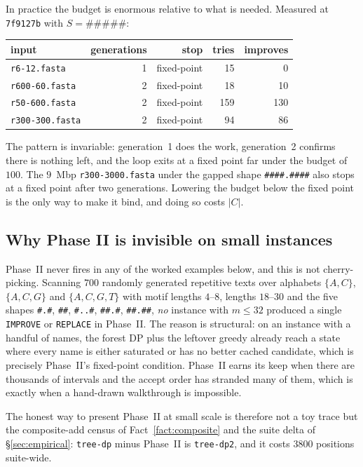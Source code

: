 \documentclass[11pt,a4paper]{article}
\theoremstyle{definition}
\theoremstyle{plain}
\theoremstyle{remark}
\begin{document}
In practice the budget is enormous relative to what is needed.
Measured at \texttt{7f9127b} with $S = \mathtt{\#\#\#\#\#}$:

\begin{center}
\begin{tabular}{lrrrr}
\toprule
input & generations & stop & tries & improves \\
\midrule
\texttt{r6-12.fasta}   & 1 & fixed-point &  15 &   0 \\
\texttt{r600-60.fasta} & 2 & fixed-point &  18 &  10 \\
\texttt{r50-600.fasta} & 2 & fixed-point & 159 & 130 \\
\texttt{r300-300.fasta}& 2 & fixed-point &  94 &  86 \\
\bottomrule
\end{tabular}
\end{center}

The pattern is invariable: generation~1 does the work, generation~2
confirms there is nothing left, and the loop exits at a fixed point far
under the budget of $100$. The $9$~Mbp \texttt{r300-3000.fasta} under
the gapped shape \texttt{\#\#\#\#.\#\#\#\#} also stops at a fixed point
after two generations. Lowering the budget below the fixed point is the
only way to make it bind, and doing so costs $|C|$.

\subsection{Why Phase II is invisible on small instances}
\label{sec:phase2:small}

Phase~II never fires in any of the worked examples below, and this is
not cherry-picking. Scanning $700$ randomly generated repetitive texts
over alphabets $\{A,C\}$, $\{A,C,G\}$ and $\{A,C,G,T\}$ with motif
lengths $4$--$8$, lengths $18$--$30$ and the five shapes
\texttt{\#.\#}, \texttt{\#\#}, \texttt{\#..\#}, \texttt{\#\#.\#},
\texttt{\#\#.\#\#}, \emph{no} instance with $m \le 32$ produced a single
\texttt{IMPROVE} or \texttt{REPLACE} in Phase~II. The reason is
structural: on an instance with a handful of names, the forest DP plus
the leftover greedy already reach a state where every name is either
saturated or has no better cached candidate, which is precisely
Phase~II's fixed-point condition. Phase~II earns its keep when there are
thousands of intervals and the accept order has stranded many of them,
which is exactly when a hand-drawn walkthrough is impossible.

The honest way to present Phase~II at small scale is therefore not a toy
trace but the composite-add census of Fact~\ref{fact:composite} and the
suite delta of \S\ref{sec:empirical}: \texttt{tree-dp} minus Phase~II is
\texttt{tree-dp2}, and it costs $3800$ positions suite-wide.
\end{document}
